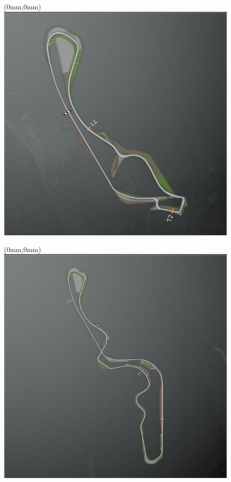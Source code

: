 \null\newpage
\begin{textblock*}{30mm}(0mm,0mm)%
\includegraphics[width=120mm]{TR/2015-05-20_00055.png}
\end{textblock*}
\null\newpage
\begin{textblock*}{30mm}(0mm,0mm)%
\includegraphics[width=120mm]{TR/2015-05-20_00052.png}
\end{textblock*}
